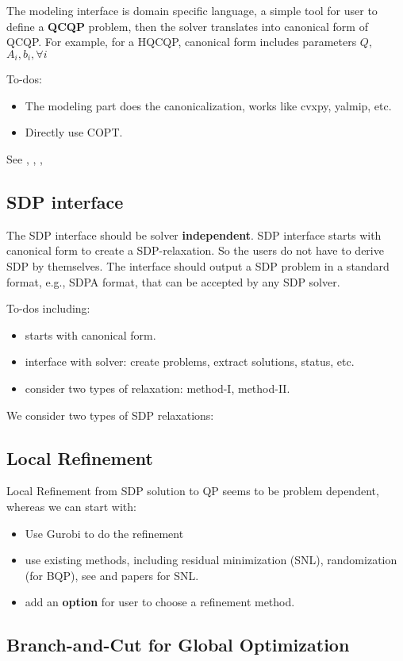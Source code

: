 \documentclass[../main]{subfiles}
\begin{document}
The modeling interface is domain specific language, a simple tool for
user to define a \textbf{QCQP} problem, then the solver translates into
canonical form of QCQP. For example, for a HQCQP, canonical form
includes parameters \(Q\), \(A_i, b_i, \forall i\)

To-dos:

\begin{itemize}
      \tightlist
      \item
            The modeling part does the canonicalization, works like cvxpy, yalmip,
            etc.
      \item
            Directly use COPT.
\end{itemize}

See \cite{agrawal_rewriting_2018}, \cite{diamond_cvxpy_2016},
\cite{dunning_jump_2017}, \cite{lofberg_yalmip_2004}

\subsection{SDP interface}\label{sdp-interface}

The SDP interface should be solver \textbf{independent}. SDP interface
starts with canonical form to create a SDP-relaxation. So the users do
not have to derive SDP by themselves. The interface should output a SDP
problem in a standard format, e.g., SDPA format, that can be accepted by
any SDP solver.

To-dos including:

\begin{itemize}
      \tightlist
      \item starts with canonical form.
      \item interface with solver: create problems, extract solutions, status,
            etc.
      \item consider two types of relaxation: method-I, method-II.
\end{itemize}


We consider two types of SDP relaxations:

\subsection{Local Refinement}\label{local-refinement}

Local Refinement from SDP solution to QP seems to be problem dependent,
whereas we can start with:

\begin{itemize}
      \tightlist
      \item
            Use Gurobi to do the refinement
      \item
            use existing methods, including residual minimization (SNL),
            randomization (for BQP), see \cite{luo_semidefinite_2010} and papers for
            SNL.
      \item
            add an \textbf{option} for user to choose a refinement method.
\end{itemize}


\subsection{Branch-and-Cut for Global Optimization}\label{branch-and-cut}
\end{document}
